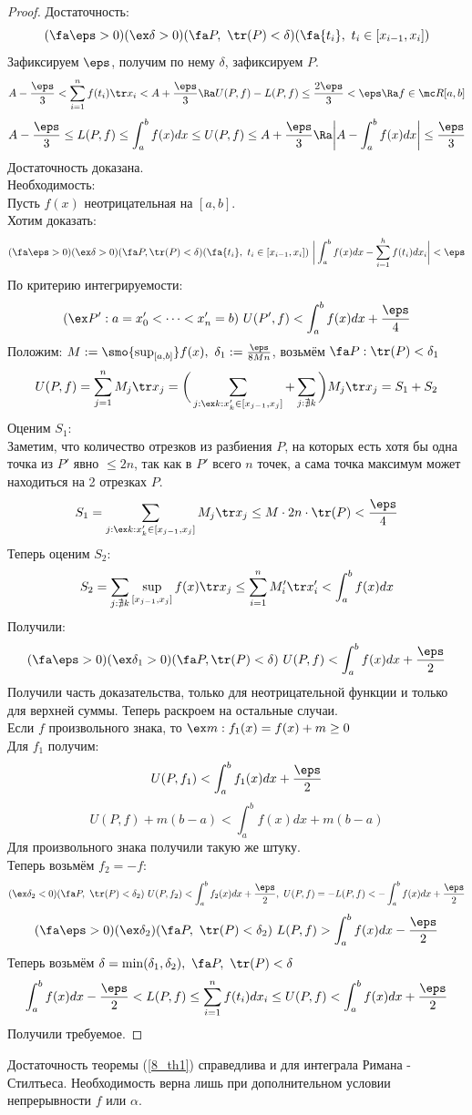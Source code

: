 \begin{proof}
	Достаточность:
	\[(\fa\eps>0)(\ex\delta>0)(\fa P,\ \tr(P)<\delta)(\fa\{t_i\},\ t_i\in[x_{i-1},x_i])\]
	Зафиксируем $\eps$, получим по нему $\delta$, зафиксируем $P$.
	\[A-\frac\eps3<\sum_{i=1}^nf(t_i)\tr x_i<A+\frac\eps3\Ra U(P,f)-L(P,f)\le \frac{2\eps}{3}<\eps\Ra f\in\mc R[a,b]\]
	\[A-\frac\eps3\le L(P,f)\le\int_a^bf(x)dx\le U(P,f)\le A+\frac\eps3\Ra\bigg|A-\int_a^bf(x)dx\bigg|\le\frac\eps3\]
	Достаточность доказана.\\
	Необходимость:\\
	Пусть $f(x)$ неотрицательная на $[a,b]$.\\
	Хотим доказать:
	\[(\fa\eps>0)(\ex\delta>0)(\fa P,\tr(P)<\delta)(\fa\{t_i\},\ t_i\in[x_{i-1},x_i])\ \bigg|\int_a^bf(x)dx-\sum_{i=1}^hf(t_i)dx_i\bigg|<\eps\]
	По критерию интегрируемости:
	\[(\ex P':a=x_0'<\dots<x_n'=b)\ U(P',f)<\int_a^bf(x)dx+\frac\eps4\]
	Положим: $M:=\smo{\sup_{[a,b]}}f(x),\ \delta_1:=\frac{\eps}{8Mn}$, возьмём $\fa P:\tr(P)<\delta_1$\\
	\[U(P,f)=\sum_{j=1}^nM_j\tr x_j=\bigg(\sum_{j:\ex k:x_k'\in[x_{j-1},x_j]}+\sum_{j:\nexists k}\bigg)M_j\tr x_j=S_1+S_2\]
	Оценим $S_1$:\\
	Заметим, что количество отрезков из разбиения $P$, на которых есть хотя бы одна точка из $P'$ явно $\le2n$, так как в $P'$ всего $n$ точек, а сама точка максимум может находиться на 2 отрезках $P$.
	\[S_1=\sum_{j:\ex k:x_k'\in[x_{j-1},x_j]}M_j\tr x_j\le M\cdot 2n\cdot \tr(P)<\frac\eps4\]
	Теперь оценим $S_2$:
	\[S_2=\sum_{j:\nexists k}\sup_{[x_{j-1},x_j]}f(x)\tr x_j\le\sum_{i=1}^nM_i'\tr x_i'<\int_a^bf(x)dx\]
	Получили:
	\[(\fa\eps>0)(\ex\delta_1>0)(\fa P,\tr(P)<\delta)\ U(P,f)<\int_a^bf(x)dx+\frac\eps2\]
	Получили часть доказательства, только для неотрицательной функции и только для верхней суммы. Теперь раскроем на остальные случаи.\\
	Если $f$ произвольного знака, то $\ex m:f_1(x)=f(x)+m\ge0$\\
	Для $f_1$ получим:
	\[U(P,f_1)<\int_a^bf_1(x)dx+\frac\eps2\]
	\[U(P,f)+m(b-a)<\int_a^bf(x)dx+m(b-a)\]
	Для произвольного знака получили такую же штуку.\\
	Теперь возьмём $f_2=-f$:
	\[(\ex\delta_2<0)(\fa P,\ \tr(P)<\delta_2)\ U(P,f_2)<\int_a^bf_2(x)dx+\frac\eps2,\ U(P,f)=-L(P,f)<-\int_a^bf(x)dx+\frac\eps2\]
	\[(\fa\eps>0)(\ex\delta_2)(\fa P,\ \tr(P)<\delta_2)\ L(P,f)>\int_a^bf(x)dx-\frac\eps2\]
	Теперь возьмём $\delta=\min(\delta_1,\delta_2),\ \fa P,\ \tr(P)<\delta$
	\[\int_a^bf(x)dx-\frac\eps2<L(P,f)\le\sum_{i=1}^nf(t_i)dx_i\le U(P,f)<\int_a^bf(x)dx+\frac\eps2\]
	Получили требуемое.
\end{proof}
\begin{note}
	Достаточность теоремы (\ref{8_th1}) справедлива и для интеграла Римана - Стилтьеса. Необходимость верна лишь при дополнительном условии непрерывности $f$ или $\alpha$.
\end{note}